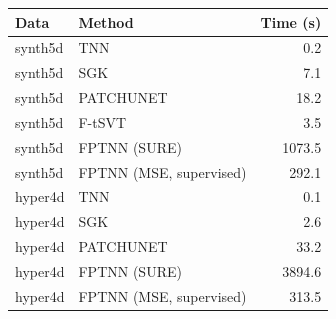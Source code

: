\begin{tabular}{llr}
\hline
Data & Method & Time (s) \\
\hline
synth5d & TNN & 0.2 \\
synth5d & SGK & 7.1 \\
synth5d & PATCHUNET & 18.2 \\
synth5d & F-tSVT & 3.5 \\
synth5d & FPTNN (SURE) & 1073.5 \\
synth5d & FPTNN (MSE, supervised) & 292.1 \\
hyper4d & TNN & 0.1 \\
hyper4d & SGK & 2.6 \\
hyper4d & PATCHUNET & 33.2 \\
hyper4d & FPTNN (SURE) & 3894.6 \\
hyper4d & FPTNN (MSE, supervised) & 313.5 \\
\hline
\end{tabular}
